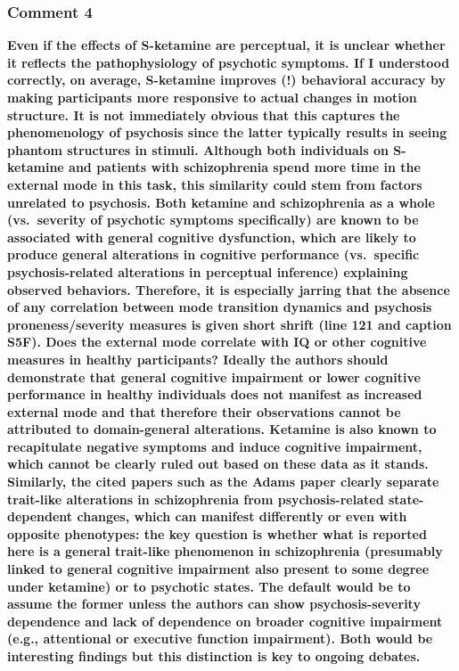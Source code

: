 \documentclass[
]{article}
\begin{document}
\subsubsection{Comment 4}\label{comment-4-2}

\textbf{Even if the effects of S-ketamine are perceptual, it is unclear
whether it reflects the pathophysiology of psychotic symptoms. If I
understood correctly, on average, S-ketamine improves (!) behavioral
accuracy by making participants more responsive to actual changes in
motion structure. It is not immediately obvious that this captures the
phenomenology of psychosis since the latter typically results in seeing
phantom structures in stimuli. Although both individuals on S-ketamine
and patients with schizophrenia spend more time in the external mode in
this task, this similarity could stem from factors unrelated to
psychosis. Both ketamine and schizophrenia as a whole (vs.~severity of
psychotic symptoms specifically) are known to be associated with general
cognitive dysfunction, which are likely to produce general alterations
in cognitive performance (vs.~specific psychosis-related alterations in
perceptual inference) explaining observed behaviors. Therefore, it is
especially jarring that the absence of any correlation between mode
transition dynamics and psychosis proneness/severity measures is given
short shrift (line 121 and caption S5F). Does the external mode
correlate with IQ or other cognitive measures in healthy participants?
Ideally the authors should demonstrate that general cognitive impairment
or lower cognitive performance in healthy individuals does not manifest
as increased external mode and that therefore their observations cannot
be attributed to domain-general alterations. Ketamine is also known to
recapitulate negative symptoms and induce cognitive impairment, which
cannot be clearly ruled out based on these data as it stands. Similarly,
the cited papers such as the Adams paper clearly separate trait-like
alterations in schizophrenia from psychosis-related state-dependent
changes, which can manifest differently or even with opposite
phenotypes: the key question is whether what is reported here is a
general trait-like phenomenon in schizophrenia (presumably linked to
general cognitive impairment also present to some degree under ketamine)
or to psychotic states. The default would be to assume the former unless
the authors can show psychosis-severity dependence and lack of
dependence on broader cognitive impairment (e.g., attentional or
executive function impairment). Both would be interesting findings but
this distinction is key to ongoing debates.}
\end{document}
